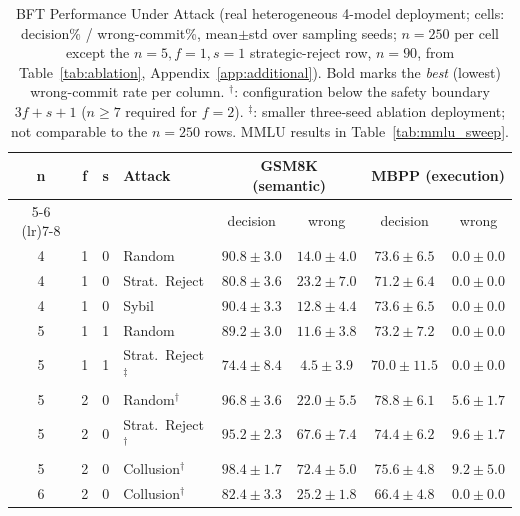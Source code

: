 \documentclass{article}
\begin{document}
\begin{table}[htbp]
\centering\small
\caption{BFT Performance Under Attack (real heterogeneous 4-model deployment; cells: decision\% / wrong-commit\%, mean$\pm$std over sampling seeds; $n{=}250$ per cell except the $n{=}5, f{=}1, s{=}1$ strategic-reject row, $n{=}90$, from Table~\ref{tab:ablation}, Appendix~\ref{app:additional}). Bold marks the \emph{best} (lowest) wrong-commit rate per column. $^\dag$: configuration below the safety boundary $3f{+}s{+}1$ ($n \geq 7$ required for $f{=}2$). $^{\ddag}$: smaller three-seed ablation deployment; not comparable to the $n{=}250$ rows. MMLU results in Table~\ref{tab:mmlu_sweep}.}
\label{tab:bft}
\begin{tabular}{ccclcccc}
\toprule
\textbf{n} & \textbf{f} & \textbf{s} & \textbf{Attack} & \multicolumn{2}{c}{\textbf{GSM8K (semantic)}} & \multicolumn{2}{c}{\textbf{MBPP (execution)}} \\
\cmidrule(lr){5-6} \cmidrule(lr){7-8}
 & & & & decision & wrong & decision & wrong \\
\midrule
4 & 1 & 0 & Random & $90.8 \pm 3.0$ & $14.0 \pm 4.0$ & $73.6 \pm 6.5$ & $\mathbf{0.0 \pm 0.0}$ \\
4 & 1 & 0 & Strat.\ Reject & $80.8 \pm 3.6$ & $23.2 \pm 7.0$ & $71.2 \pm 6.4$ & $\mathbf{0.0 \pm 0.0}$ \\
4 & 1 & 0 & Sybil & $90.4 \pm 3.3$ & $12.8 \pm 4.4$ & $73.6 \pm 6.5$ & $\mathbf{0.0 \pm 0.0}$ \\
5 & 1 & 1 & Random & $89.2 \pm 3.0$ & $11.6 \pm 3.8$ & $73.2 \pm 7.2$ & $\mathbf{0.0 \pm 0.0}$ \\
5 & 1 & 1 & Strat.\ Reject$^{\ddag}$ & $74.4 \pm 8.4$ & $\mathbf{4.5 \pm 3.9}$ & $70.0 \pm 11.5$ & $\mathbf{0.0 \pm 0.0}$ \\
5 & 2 & 0 & Random$^\dag$ & $96.8 \pm 3.6$ & $22.0 \pm 5.5$ & $78.8 \pm 6.1$ & $5.6 \pm 1.7$ \\
5 & 2 & 0 & Strat.\ Reject$^\dag$ & $95.2 \pm 2.3$ & $67.6 \pm 7.4$ & $74.4 \pm 6.2$ & $9.6 \pm 1.7$ \\
5 & 2 & 0 & Collusion$^\dag$ & $98.4 \pm 1.7$ & $72.4 \pm 5.0$ & $75.6 \pm 4.8$ & $9.2 \pm 5.0$ \\
6 & 2 & 0 & Collusion$^\dag$ & $82.4 \pm 3.3$ & $25.2 \pm 1.8$ & $66.4 \pm 4.8$ & $\mathbf{0.0 \pm 0.0}$ \\
\bottomrule
\end{tabular}
\end{table}
\end{document}
